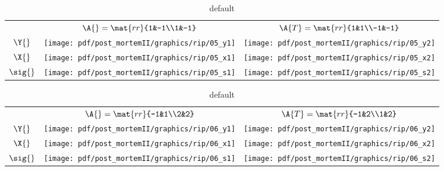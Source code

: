\begin{table}[htdp]
\begin{center}
\begin{tabular}{ccc}
 & $\A{}=\mat{rr}{1&-1\\1&-1}$ & $\A{T} = \mat{rr}{1&1\\-1&-1} $ \\[35pt]
 $\Y{}$   & \qquad \texttt{[image: pdf/post\_mortemII/graphics/rip/05\_y1]} 
          & \qquad \texttt{[image: pdf/post\_mortemII/graphics/rip/05\_y2]} \\[15pt]
 $\X{}$   & \qquad \texttt{[image: pdf/post\_mortemII/graphics/rip/05\_x1]}
          & \qquad \texttt{[image: pdf/post\_mortemII/graphics/rip/05\_x2]} \\[20pt]
 $\sig{}$ &        \texttt{[image: pdf/post\_mortemII/graphics/rip/05\_s1]}
          &        \texttt{[image: pdf/post\_mortemII/graphics/rip/05\_s2]} \\[20pt]
\end{tabular}
\end{center}
\label{tab:pmII:visualse}
\caption{default}
\end{table}%
\clearpage

\begin{table}[htdp]
\begin{center}
\begin{tabular}{ccc}
 & $\A{}=\mat{rr}{-1&1\\2&2}$ & $\A{T} = \mat{rr}{-1&2\\1&2} $ \\[35pt]
 $\Y{}$   & \qquad \texttt{[image: pdf/post\_mortemII/graphics/rip/06\_y1]} 
          & \qquad \texttt{[image: pdf/post\_mortemII/graphics/rip/06\_y2]} \\[15pt]
 $\X{}$   & \qquad \texttt{[image: pdf/post\_mortemII/graphics/rip/06\_x1]}
          & \qquad \texttt{[image: pdf/post\_mortemII/graphics/rip/06\_x2]} \\[20pt]
 $\sig{}$ & \quad  \texttt{[image: pdf/post\_mortemII/graphics/rip/06\_s1]}
          & \quad  \texttt{[image: pdf/post\_mortemII/graphics/rip/06\_s2]} \\[20pt]
\end{tabular}
\end{center}
\label{tab:pmII:visualsf}
\caption{default}
\end{table}%
\clearpage

